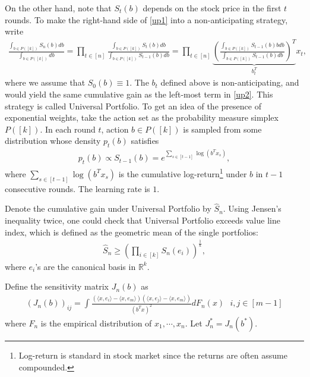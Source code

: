 \documentclass[letterpaper,11pt,openright,openany]{book}
\numberwithin{equation}{section}
\theoremstyle{plain}
\theoremstyle{definition}
\def\R{{\mathbb R}}
\def\R{{\mathbb R}}
\begin{document}
On the other hand, note that $S_t(b)$ depends on the stock price in the first $t$ rounds. To make the right-hand side of \eqref{up1} into a non-anticipating strategy, write
\begin{align}
\frac{\int_{b\in P([k])}S_n(b)db}{\int_{b\in P([k])}db}=\prod_{t\in [n]}\frac{\int_{b\in P([k])}S_t(b)db}{\int_{b\in P([k])}S_{t-1}(b)db}=\prod_{t\in [n]}\underbrace{\left(\frac{\int_{b\in P([k])}S_{t-1}(b)bdb}{\int_{b\in P([k])}S_{t-1}(b)db}\right)^T}_{b^T_t}x_t, \label{up2}
\end{align}
where we assume that $S_0(b)\equiv 1$. The $b_t$ defined above is non-anticipating, and would yield the same cumulative gain as the left-most term in \eqref{up2}. This strategy is called Universal Portfolio. To get an idea of the presence of exponential weights, take the action set as the probability measure simplex $P([k])$. In each round $t$, action $b\in P([k])$ is sampled from some distribution whose density $p_t(b)$ satisfies
\begin{align*}
p_t(b)\propto S_{t-1}(b) = e^{\sum_{s\in [t-1]}\log(b^Tx_s)},
\end{align*} 
where $\sum_{s\in [t-1]}\log(b^Tx_s)$ is the cumulative log-return\footnote{Log-return is standard in stock market since the returns are often assume compounded. } under $b$ in $t-1$ consecutive rounds. The learning rate is $1$. 

Denote the cumulative gain under Universal Portfolio by $\hat{S}_n$.
Using Jensen's inequality twice, one could check that Universal Portfolio exceeds value line index, which is defined as the geometric mean of the single portfolios:
\begin{align*}
\hat{S}_n\geq\left(\prod_{i\in [k]}S_n(e_i)\right)^{\frac{1}{k}},
\end{align*}
where $e_i$'s are the canonical basis in $\R^k$. 

Define the sensitivity matrix $J_n(b)$ as
\begin{align*}
(J_n(b))_{ij} = \int\frac{(\langle x, e_i\rangle-\langle x, e_m\rangle)(\langle x, e_j\rangle-\langle x, e_m\rangle)}{(b^Tx)^2}dF_n(x)\ \ \ i,j\in [m-1]
\end{align*}
where $F_n$ is the empirical distribution of $x_1, \cdots, x_n$. Let $J_n^* = J_n(b^*)$. 
\end{document}
